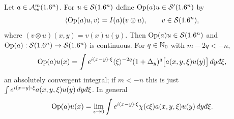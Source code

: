 \begin{proposition}\label{euclidean:prop:action-S}
  Let $a\in\mathcal{A}^{m}_{w}(1.6^n)$. For $u\in\mathcal{S}(1.6^n)$ define $\operatorname{Op}(a)u\in\mathcal{S}'(1.6^n)$
  by
  \begin{equation}\label{euclidean:eq:Op-def}
    \langle \operatorname{Op}(a)u, v\rangle=I(a)(v\otimes u),\qquad v\in\mathcal{S}(1.6^n),
  \end{equation}
  where $(v\otimes u)(x,y)=v(x)u(y)$. Then $\operatorname{Op}(a)u\in\mathcal{S}(1.6^n)$ and
  $\operatorname{Op}(a):\mathcal{S}(1.6^n)\to\mathcal{S}(1.6^n)$ is continuous. For $q\in\mathbb{N}_0$ with
  $m-2q<-n$,
  \begin{equation}\label{euclidean:eq:Op-formula}
    \Op(a)u(x)=\int e^{i(x-y)\cdot\xi}\ang\xi^{-2q}(1+\Delta_y)^q
    \bigl[a(x,y,\xi)u(y)\bigr]\,dy\,\dbar\xi,
  \end{equation}
  an absolutely convergent integral; if $m<-n$ this is just
  $\int e^{i(x-y)\cdot\xi}a(x,y,\xi)u(y)\,dy\,\dbar\xi$. In general
  \begin{equation*}
    \Op(a)u(x)=\lim_{\eps\to0}\int e^{i(x-y)\cdot\xi}\chi(\eps\xi)a(x,y,\xi)u(y)\,dy\,\dbar\xi.
  \end{equation*}
\end{proposition}
